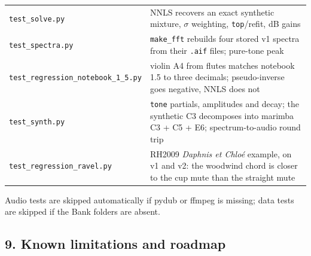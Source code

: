 \documentclass[
  10pt,
]{article}
\begin{document}
\begin{longtable}[]{@{}ll@{}}
\begin{minipage}[t]{0.47\columnwidth}
\texttt{test\_solve.py}\strut
\end{minipage} &
\begin{minipage}[t]{0.47\columnwidth}\raggedright
NNLS recovers an exact synthetic mixture, $\sigma$ weighting,
\texttt{top}/refit, dB gains\strut
\end{minipage}\tabularnewline
\begin{minipage}[t]{0.47\columnwidth}\raggedright
\texttt{test\_spectra.py}\strut
\end{minipage} &
\begin{minipage}[t]{0.47\columnwidth}\raggedright
\texttt{make\_fft} rebuilds four stored v1 spectra from
their \texttt{.aif} files; pure-tone peak\strut
\end{minipage}\tabularnewline
\begin{minipage}[t]{0.47\columnwidth}\raggedright
\texttt{test\_regression\_notebook\_1\_5.py}\strut
\end{minipage} &
\begin{minipage}[t]{0.47\columnwidth}\raggedright
violin A4 from flutes matches notebook 1.5 to three
decimals; pseudo-inverse goes negative, NNLS does not\strut
\end{minipage}\tabularnewline
\begin{minipage}[t]{0.47\columnwidth}\raggedright
\texttt{test\_synth.py}\strut
\end{minipage} &
\begin{minipage}[t]{0.47\columnwidth}\raggedright
\texttt{tone} partials, amplitudes and decay; the synthetic
C3 decomposes into marimba C3 + C5 + E6; spectrum-to-audio
round trip\strut
\end{minipage}\tabularnewline
\begin{minipage}[t]{0.47\columnwidth}\raggedright
\texttt{test\_regression\_ravel.py}\strut
\end{minipage} &
\begin{minipage}[t]{0.47\columnwidth}\raggedright
RH2009 \emph{Daphnis et Chloé} example, on v1 and v2: the
woodwind chord is closer to the cup mute than the straight
mute\strut
\end{minipage}\tabularnewline
\bottomrule
\end{longtable}

Audio tests are skipped automatically if pydub or ffmpeg is
missing; data tests are skipped if the Bank folders are
absent.

\subsection{9. Known limitations and roadmap}
\end{document}
